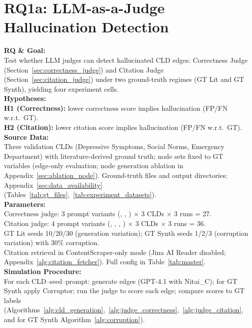 \section{RQ1a: LLM-as-a-Judge Hallucination Detection}
\label{sec:rq1a_experiments}

\noindent\textbf{RQ \& Goal:}\\
Test whether LLM judges can detect hallucinated CLD edges: Correctness Judge (Section~\ref{sec:correctness_judge}) and Citation Judge (Section~\ref{sec:citation_judge}) under two ground-truth regimes (GT Lit and GT Synth), yielding four experiment cells.\\
\textbf{Hypotheses:}\\
\textbf{H1 (Correctness):} lower correctness score implies hallucination (FP/FN w.r.t.\ GT).\\
\textbf{H2 (Citation):} lower citation score implies hallucination (FP/FN w.r.t.\ GT).\\
\textbf{Source Data:}\\
Three validation CLDs (Depressive Symptoms, Social Norms, Emergency Department) with literature-derived ground truth; node sets fixed to GT variables (edge-only evaluation; node generation ablation in Appendix~\ref{sec:ablation_node}). Ground-truth files and output directories: Appendix~\ref{sec:data_availability} (Tables~\ref{tab:gt_files},~\ref{tab:experiment_datasets}).\\
\textbf{Parameters:}\\
Correctness judge: 3 prompt variants (\PromptBaseline, \PromptCoT, \PromptMechanistic) $\times$ 3 CLDs $\times$ 3 runs = 27.\\
Citation judge: 4 prompt variants (\PromptBaseline, \PromptCoT, \PromptMechanistic, \PromptMechanisticLit) $\times$ 3 CLDs $\times$ 3 runs = 36.\\
GT Lit seeds 10/20/30 (generation variation); GT Synth seeds 1/2/3 (corruption variation) with 30\% corruption.\\
Citation retrieval in ContentScraper-only mode (Jina AI Reader disabled; Appendix~\ref{alg:citation_fetcher}). Full config in Table~\ref{tab:master}.\\
\textbf{Simulation Procedure:}\\
For each CLD--seed--prompt: generate edges (GPT-4.1 with Nitai\_C); for GT Synth apply Corruptor; run the judge to score each edge; compare scores to GT labels (Algorithms~\ref{alg:cld_generation},~\ref{alg:judge_correctness},~\ref{alg:judge_citation}, and for GT Synth Algorithm~\ref{alg:corruption}).\\
